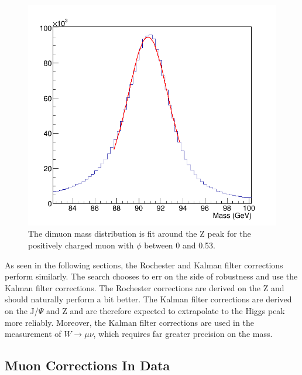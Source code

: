 \begin{figure}[!h]
  \centering
  \includegraphics[width=0.55\linewidth]{images/muon_calib/voigt_fit_z_example_w_fit.png}
  \caption[An example fit used for the dimuon mass calibrations.]
   {The dimuon mass distribution is fit around the Z peak for the positively charged muon with $\phi$ between 0 and 0.53.}
  \label{fig:voigt_fit_example}
\end{figure}

As seen in the following sections, the Rochester and Kalman filter corrections perform similarly. The search chooses to err on the side of robustness and use the Kalman filter corrections. The Rochester corrections are derived on the Z and should naturally perform a bit better. The Kalman filter corrections are derived on the J/$\Psi$ and Z and are therefore expected to extrapolate to the Higgs peak more reliably. Moreover, the Kalman filter corrections are used in the measurement of $W\rightarrow\mu\nu$, which requires far greater precision on the mass.    

\subsection{Muon Corrections In Data}


